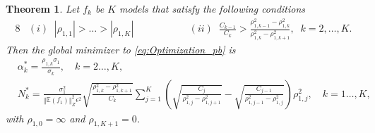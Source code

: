 \documentclass[final,3p,times,11pt]{elsarticle}
\newtheorem{theorem}{Theorem}%
\begin{document}
\begin{theorem}
\label{thm:Sample_size_est}
Let $f_k$ be $K$ models that satisfy the following conditions
%
\begin{alignat*}{8}
    &(i)\;\; |\rho_{1,1}|>\ldots>|\rho_{1,K}|& \qquad \qquad
    &(ii)\;\; \frac{C_{k-1}}{C_k}>\frac{\rho_{1,k-1}^2-\rho_{1,k}^2}{\rho_{1,k}^2-\rho_{1,k+1}^2},\;\;k=2,\ldots,K.
\end{alignat*}
%
Then the global minimizer to \eqref{eq:Optimization_pb} is 
\begin{align*}
    &\alpha_k^*=\frac{\rho_{1,k}\sigma_1}{\sigma_k}, \quad k=2\ldots, K,\\
    &N_k^*=\frac{\sigma_1^2}{\left\Vert\mathbb{E}(f_1) \right\Vert_{Z}^2\epsilon^2}\sqrt{\frac{\rho_{1,k}^2 - \rho_{1,k+1}^2}{C_k}}\sum_{j=1}^K\left(\sqrt{\frac{C_j}{\rho_{1,j}^2 - \rho_{1,j+1}^2}} - \sqrt{\frac{C_{j-1}}{\rho_{1,{j-1}}^2 - \rho_{1,j}^2}}\right)\rho_{1,j}^2, \quad k=1\ldots, K,
\end{align*}
with $\rho_{1,0}=\infty$ and $\rho_{1,K+1}=0$.

\end{theorem}
\end{document}
